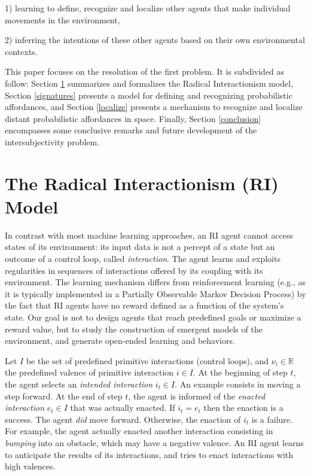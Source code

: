 \documentclass[conference]{IEEEtran}
\begin{document}
1) learning to define, recognize and localize other agents that make individual movements in the environment,

2) inferring the intentions of these other agents based on their own environmental contexts. %

This paper focuses on the resolution of the first problem. 
It is subdivided as follow: Section \ref{RI} summarizes and formalizes the Radical Interactionism model, Section \ref{signatures} presents a model for defining and recognizing probabilistic affordances, and Section \ref{localize} presents a mechanism to recognize and localize distant probabilistic affordances in space. Finally, Section \ref{conclusion} encompasses some conclusive remarks and future development of the intersubjectivity problem.




\section{The Radical Interactionism (RI) Model}\label{RI}


In contrast with most machine learning approaches, an RI agent cannot access states of its environment: %
its input data is not a percept of a state but an outcome of a control loop, called \textit{interaction}.
The agent learns and exploits regularities in sequences of interactions offered by its coupling with its environment.
The learning mechanism differs from reinforcement learning (e.g., as it is typically implemented in a Partially Observable Markov Decision Process) by the fact that RI agents have no reward defined as a function of the system's state.
Our goal is not to design agents that reach predefined goals or maximize a reward value, but to study the construction of emergent models of the environment, and generate open-ended learning and behaviors.

Let $I$ be the set of predefined primitive interactions (control loops), and $\nu_i \in \mathbb{R}$ the predefined valence of primitive interaction $i \in I$.
At the beginning of step $t$, the agent selects an \textit{intended interaction} $i_t \in I$.
An example consists in moving a step forward. %
At the end of step $t$, the agent is informed of the \textit{enacted interaction} $e_t \in I$ that was actually enacted. 
If $i_t = e_t$ then the enaction is a success. 
The agent \textit{did} move forward.
Otherwise, the enaction of $i_t$ is a failure.
For example, the agent actually enacted another interaction consisting in \textit{bumping} into an obstacle, which may have a negative valence.
An RI agent learns to anticipate the results of its interactions, and tries to enact interactions with high valences.
\end{document}
